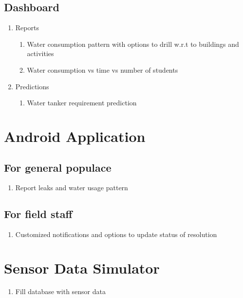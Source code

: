 \documentclass[paper=a4, fontsize=11pt]{scrartcl} %
\numberwithin{equation}{section} %
\numberwithin{figure}{section} %
\numberwithin{table}{section} %
\begin{document}
\subsection{ Dashboard }
\begin{enumerate}
\item
Reports
\begin{enumerate}
\item
Water consumption pattern with options to drill w.r.t to buildings and activities
\item
Water consumption vs time vs number of students
\end{enumerate}
\item
Predictions
\begin{enumerate}
\item
Water tanker requirement prediction
\end{enumerate}
\end{enumerate}



\section{Android Application}
\subsection{For general populace}
\begin{enumerate}
\item
Report leaks and water usage pattern
\end{enumerate}

\subsection{For field staff}
\begin{enumerate}
\item
Customized notifications and options to update status of resolution
\end{enumerate}

\section{Sensor Data Simulator}
\begin{enumerate}
\item
Fill database with sensor data
\end{enumerate}
\end{document}
